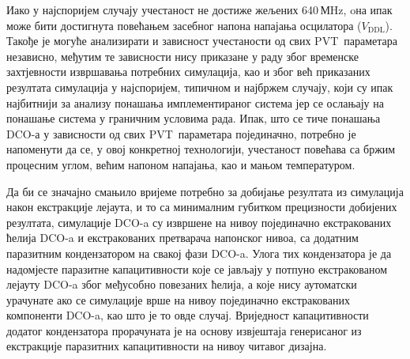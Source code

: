 \documentclass[master]{finthesis}
\def \DCO  {DCO} %
\def \PVT  {PVT} %
\begin{document}
Иако у најспоријем случају учестаност не достиже жељених 640\,МHz, oна ипак може бити достигнута повећањем засебног напона напајања осцилатора ($V_\text{DDL}$). Такође је могуће анализирати и зависност учестаности од свих \PVT\ параметара независно, међутим те зависности нису приказане у раду због временске захтјевности извршавања потребних симулација, као и због већ приказаних резултата симулација у најспоријем, типичном и најбржем случају, који су ипак најбитнији за анализу понашања имплементираног система јер се ослањају на понашање система у граничним условима рада. Ипак, што се тиче понашања \DCO-а у зависности од свих \PVT\ параметара појединачно, потребно је напоменути да се, у овој конкретној технологији, учестаност повећава са бржим процесним углом, већим напоном напајања, као и мањом температуром. \par
Да би се значајно смањило вријеме потребно за добијање резултата из симулација након екстракције лејаута, и то са минималним губитком прецизности добијених резултата, симулације \DCO-a су извршене на нивоу појединачно екстракованих ћелија \DCO-a и екстракованих претварача напонског нивоа, са додатним паразитним кондензатором на свакој фази \DCO-a. Улога тих кондензатора је да надомјесте паразитне капацитивности које се јављају у потпуно екстракованом лејауту \DCO-a због међусобно повезаних ћелија, а које нису аутоматски урачунате ако се симулације врше на нивоу појединачно екстракованих компоненти \DCO-a, као што је то овде случај. Вриједност капацитивности додатог кондензатора прорачуната је на основу извјештаја генерисаног из екстракције паразитних капацитивности на нивоу читавог дизајна.  
\end{document}
